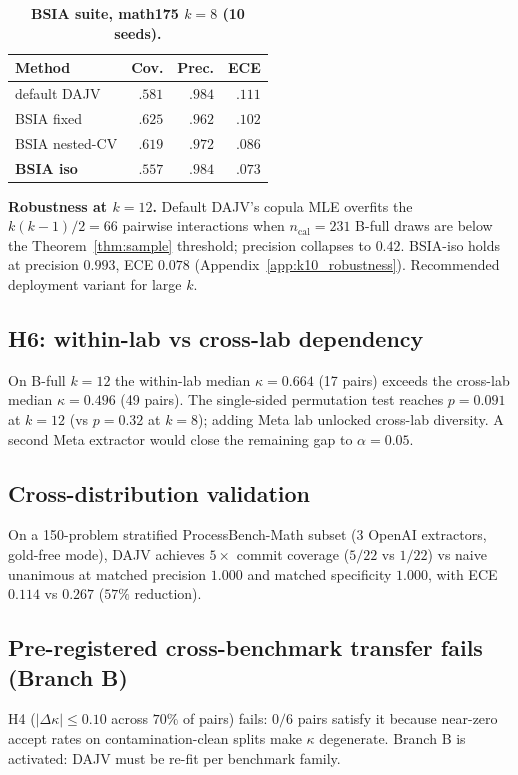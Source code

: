 \begin{table}[h]
\centering
\caption{\textbf{BSIA suite, math175 $k=8$ (10 seeds).}}
\label{tab:h7_brief}
\small
\setlength{\tabcolsep}{4pt}
\begin{tabular}{lrrr}
\toprule
Method & Cov. & Prec. & ECE \\
\midrule
default DAJV     & $.581$ & $.984$ & $.111$ \\
BSIA fixed       & $\mathbf{.625}$ & $.962$ & $.102$ \\
BSIA nested-CV   & $.619$ & $.972$ & $.086$ \\
\textbf{BSIA iso}& $.557$ & $.984$ & $\mathbf{.073}$ \\
\bottomrule
\end{tabular}
\end{table}

\textbf{Robustness at $k=12$.} Default DAJV's copula MLE
overfits the $k(k-1)/2 = 66$ pairwise interactions when
$n_{\text{cal}} = 231$ B-full draws are below the
Theorem~\ref{thm:sample} threshold; precision collapses to $0.42$.
BSIA-iso holds at precision $0.993$, ECE $0.078$
(Appendix~\ref{app:k10_robustness}). Recommended deployment
variant for large $k$.

\subsection{H6: within-lab vs cross-lab dependency}

On B-full $k=12$ the within-lab median $\kappa = 0.664$ (17 pairs)
exceeds the cross-lab median $\kappa = 0.496$ (49 pairs). The
single-sided permutation test reaches $p = 0.091$ at $k=12$ (vs
$p = 0.32$ at $k=8$); adding Meta lab unlocked cross-lab diversity.
A second Meta extractor would close the remaining gap to
$\alpha = 0.05$.

\subsection{Cross-distribution validation}

On a 150-problem stratified ProcessBench-Math subset (3 OpenAI
extractors, gold-free mode), DAJV achieves $5\times$ commit
coverage ($5/22$ vs $1/22$) vs naive unanimous at matched
precision $1.000$ and matched specificity $1.000$, with ECE
$0.114$ vs $0.267$ ($57\%$ reduction).

\subsection{Pre-registered cross-benchmark transfer fails (Branch B)}
\label{sec:ablation_A4}

H4 ($|\Delta \kappa| \leq 0.10$ across $70\%$ of pairs) fails:
$0/6$ pairs satisfy it because near-zero accept rates on
contamination-clean splits make $\kappa$ degenerate. Branch B is
activated: DAJV must be re-fit per benchmark family.
